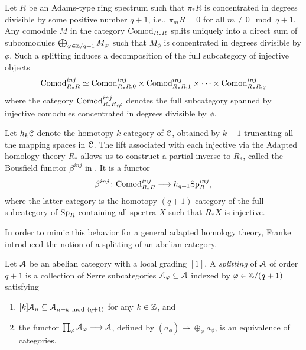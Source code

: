 \begin{construction}
    \label{ch1:const:splitting-of-comodules}
    Let $R$ be an Adams-type ring spectrum such that $\pi_*R$ is concentrated in degrees divisible by some positive number $q+1$, i.e., $\pi_m R = 0$ for all $m\neq 0 \mod q+1$. Any comodule $M$ in the category $\mathrm{Comod}_{R_*R}$ splits uniquely into a direct sum of subcomodules $\bigoplus_{\varphi \in \mathbb{Z}/q+1} M_\varphi$ such that $M_\phi$ is concentrated in degrees divisible by $\phi$. Such a splitting induces a decomposition of the full subcategory of injective objects 
    $$\mathrm{Comod}_{R_*R}^{inj} \simeq \mathrm{Comod}_{R_*R, 0}^{inj}\times \mathrm{Comod}_{R_*R, 1}^{inj}\times \cdots \times \mathrm{Comod}_{R_*R, q}^{inj}$$ 
    where the category $\mathrm{Comod}_{R_*R, \varphi}^{inj}$ denotes the full subcategory spanned by injective comodules concentrated in degrees divisible by $\phi$. 
    
    Let $h_k \EuScript{C}$ denote the homotopy $k$-category of $\EuScript{C}$, obtained by $k+1$-truncating all the mapping spaces in $\EuScript{C}$.  
    The lift associated with each injective via the Adapted homology theory $R_*$ allows us to construct a partial inverse to $R_*$, called the Bousfield functor $\beta^{inj}$ in \cite{patchkoria-pstragowski_2021}. It is a functor 
    \[\beta^{inj}\colon \mathrm{Comod}_{R_*R}^{inj}\longrightarrow h_{q+1} \mathrm{Sp}_R^{inj},\]
    where the latter category is the homotopy $(q+1)$-category of the full subcategory of $\mathrm{Sp}_R$ containing all spectra $X$ such that $R_*X$ is injective. %
\end{construction}
    
In order to mimic this behavior for a general adapted homology theory, Franke introduced the notion of a splitting of an abelian category. 
    
\begin{definition}
    \label{ch1:def:splitting-of-abelian-category}
    Let $\EuScript{A}$ be an abelian category with a local grading $[1]$. A \emph{splitting} of $\EuScript{A}$ of order $q+1$ is a collection of Serre subcategories $\EuScript{A}_\varphi \subseteq \EuScript{A}$ indexed by $\varphi \in \mathbb{Z}/(q+1)$ satisfying
    \begin{enumerate}
        \item $[k]\EuScript{A}_n \subseteq \EuScript{A}_{n+k ~\mathrm{mod}~ (q+1)}$ for any $k\in \mathbb{Z}$, and 
        \item the functor $\prod_{\varphi}\EuScript{A}_\varphi\longrightarrow \EuScript{A}$, defined by $(a_\phi)\mapsto \oplus_\phi a_\phi$, is an equivalence of categories. 
    \end{enumerate}
\end{definition}
    
